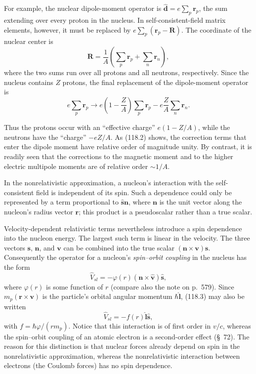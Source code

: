 For example, the nuclear dipole-moment operator is
$\hat{\mathbf d}=e\sum_p\mathbf r_p$, the sum extending over every proton in
the nucleus. In self-consistent-field matrix elements, however, it must be
replaced by $e\sum_p(\mathbf r_p-\mathbf R)$. The coordinate of the nuclear
center is
\[
 \mathbf R=\frac1A\left(\sum_p\mathbf r_p+\sum_n\mathbf r_n\right),
\]
where the two sums run over all protons and all neutrons, respectively. Since
the nucleus contains $Z$ protons, the final replacement of the dipole-moment
operator is
\begin{equation}
 e\sum_p\mathbf r_p\to
 e\left(1-\frac ZA\right)\sum_p\mathbf r_p
 -e\frac ZA\sum_n\mathbf r_n.
 \tag{118.2}
\end{equation}

Thus the protons occur with an ``effective charge'' $e(1-Z/A)$, while the
neutrons have the ``charge'' $-eZ/A$. As (118.2) shows, the correction terms
that enter the dipole moment have relative order of magnitude unity. By
contrast, it is readily seen that the corrections to the magnetic moment and
to the higher electric multipole moments are of relative order $\sim1/A$.

In the nonrelativistic approximation, a nucleon's interaction with the
self-consistent field is independent of its spin. Such a dependence could
only be represented by a term proportional to $\hat{\mathbf s}\mathbf n$,
where $\mathbf n$ is the unit vector along the nucleon's radius vector
$\mathbf r$; this product is a pseudoscalar rather than a true scalar.

Velocity-dependent relativistic terms nevertheless introduce a spin
dependence into the nucleon energy. The largest such term is linear in the
velocity. The three vectors $\mathbf s$, $\mathbf n$, and $\mathbf v$ can be
combined into the true scalar $(\mathbf n\times\mathbf v)\mathbf s$.
Consequently the operator for a nucleon's \emph{spin--orbit coupling} in the
nucleus has the form
\begin{equation}
 \hat V_{sl}=-\varphi(r)(\mathbf n\times\hat{\mathbf v})\hat{\mathbf s},
 \tag{118.3}
\end{equation}
where $\varphi(r)$ is some function of $r$ (compare also the note on p.~579).
Since $m_p(\mathbf r\times\mathbf v)$ is the particle's orbital angular
momentum $\hbar\hat{\mathbf l}$, (118.3) may also be written
\begin{equation}
 \hat V_{sl}=-f(r)\hat{\mathbf l}\hat{\mathbf s},
 \tag{118.4}
\end{equation}
with $f=\hbar\varphi/(rm_p)$. Notice that this interaction is of first order
in $v/c$, whereas the spin--orbit coupling of an atomic electron is a
second-order effect (\S~72). The reason for this distinction is that nuclear
forces already depend on spin in the nonrelativistic approximation, whereas
the nonrelativistic interaction between electrons (the Coulomb forces) has no
spin dependence.


